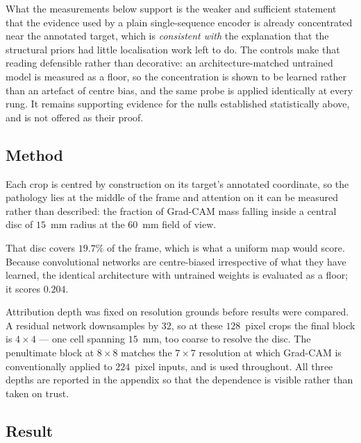 \documentclass[12pt,a4paper]{report}
\begin{document}
What the measurements below support is the weaker and sufficient statement that
the evidence used by a plain single-sequence encoder is already concentrated
near the annotated target, which is \emph{consistent with} the explanation that
the structural priors had little localisation work left to do. The controls make
that reading defensible rather than decorative: an architecture-matched
untrained model is measured as a floor, so the concentration is shown to be
learned rather than an artefact of centre bias, and the same probe is applied
identically at every rung. It remains supporting evidence for the nulls
established statistically above, and is not offered as their proof.

\subsection{Method}

Each crop is centred by construction on its target's annotated coordinate, so the
pathology lies at the middle of the frame and attention on it can be measured
rather than described: the fraction of Grad-CAM mass falling inside a central
disc of $15$~mm radius at the $60$~mm field of view.

That disc covers $19.7\%$ of the frame, which is what a uniform map would score.
Because convolutional networks are centre-biased irrespective of what they have
learned, the identical architecture with untrained weights is evaluated as a
floor; it scores $0.204$.

Attribution depth was fixed on resolution grounds before results were compared. A
residual network downsamples by $32$, so at these $128$~pixel crops the final
block is $4 \times 4$ --- one cell spanning $15$~mm, too coarse to resolve the
disc. The penultimate block at $8 \times 8$ matches the $7 \times 7$ resolution
at which Grad-CAM is conventionally applied to $224$~pixel inputs, and is used
throughout. All three depths are reported in the appendix so that the dependence
is visible rather than taken on trust.

\subsection{Result}
\end{document}
